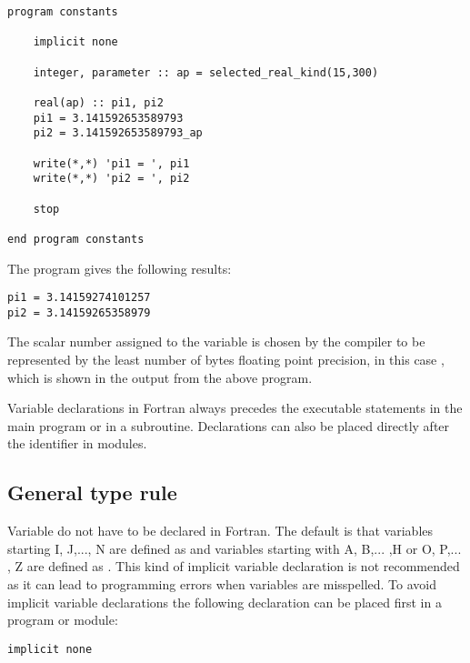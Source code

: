 \begin{lstlisting}
program constants

    implicit none

    integer, parameter :: ap = selected_real_kind(15,300)

    real(ap) :: pi1, pi2
    pi1 = 3.141592653589793
    pi2 = 3.141592653589793_ap

    write(*,*) 'pi1 = ', pi1
    write(*,*) 'pi2 = ', pi2

    stop

end program constants
\end{lstlisting}

The program gives the following results:

\cmdmode

\begin{lstlisting}
pi1 = 3.14159274101257
pi2 = 3.14159265358979
\end{lstlisting}

\fmode

The scalar number assigned to the variable  is chosen by the compiler to be represented by the least number of bytes floating point precision, in this case , which is shown in the output from the above program. 

Variable declarations in Fortran always precedes the executable statements in the main program or in a subroutine. Declarations can also be placed directly after the  identifier in modules. 

\subsection{General type rule}

Variable do not have to be declared in Fortran. The default is that variables starting I, J,..., N are defined as  and variables starting with A, B,... ,H or O, P,... , Z are defined as . This kind of implicit variable declaration is not recommended as it can lead to programming errors when variables are misspelled. To avoid implicit variable declarations the following declaration can be placed first in a program or module:

\fmode

\begin{lstlisting}
implicit none
\end{lstlisting}

